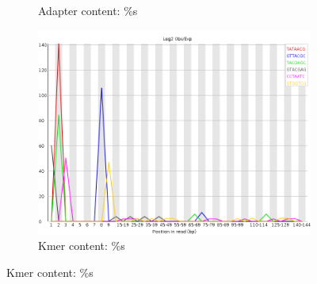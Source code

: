 \documentclass{article}
\begin{document}
\begin{figure}[htbp]
\begin{subfigure}{0.45\linewidth}
\caption{Adapter content: \%s}
\end{subfigure}
\begin{subfigure}{0.45\linewidth}
\includegraphics[width=\linewidth]{04-R1.qfilter_fastqc/Images/kmer_profiles.png}
\caption{Kmer content: \%s}
\end{subfigure}
\end{figure}
\end{document}
